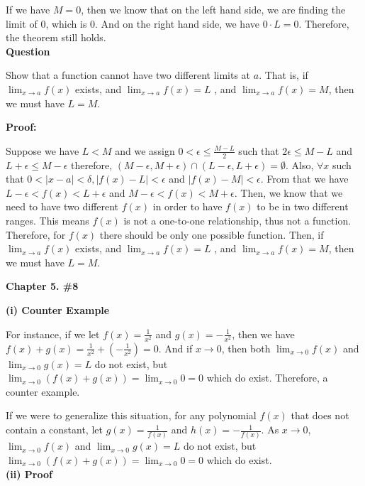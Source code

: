 \documentclass[a4paper,12pt]{report}
\begin{document}
\noindent
If we have $M=0$, then we know that on the left hand side, we are finding the limit of 0, which is 0. And on the right hand side, we have $0\cdot{L}=0$. Therefore, the theorem still holds.\\

\noindent
\textbf{Question}

\noindent
Show that a function cannot
have two different limits at $a$. That is, 
if $\displaystyle{\lim_{x\to a}}f(x)$ exists, and 
$\displaystyle{\lim_{x\to a}}f(x)=L$ , and
$\displaystyle{\lim_{x\to a}}f(x)=M$, then we
must have $L=M$.

\noindent
\textbf{Proof: }

\noindent
Suppose we have $ L < M$ and we assign $0<\epsilon\leq \frac{M-L}{2}$ such that $2\epsilon\leq M-L$ and $L+\epsilon\leq M-\epsilon$ therefore, $(M-\epsilon,M+\epsilon)\cap (L-\epsilon,L+\epsilon)=\emptyset$. Also, $\forall x $ such that $0<|x-a|<\delta, |f(x)-L|< \epsilon$ and $|f(x)-M|< \epsilon$. From that we have $L-\epsilon<f(x)<L+\epsilon$ and $M-\epsilon<f(x)<M+\epsilon$. Then, we know that we need to have two different $f(x)$ in order to have $f(x)$ to be in two different ranges. This means $f(x)$ is not a one-to-one relationship, thus not a function. Therefore, for $f(x)$ there should be only one possible function. Then, if  $\displaystyle{\lim_{x\to a}}f(x)$ exists, and 
$\displaystyle{\lim_{x\to a}}f(x)=L$ , and
$\displaystyle{\lim_{x\to a}}f(x)=M$, then we
must have $L=M$.

\pagebreak
\noindent
\textbf{Chapter 5. \#8}

\noindent
\textbf{(i) Counter Example}

\noindent
For instance, if we let \(f(x)=\frac{1}{x^2}\) and \(g(x)=-\frac{1}{x^2}\), then we have $f(x)+g(x)=\frac{1}{x^2}+(-\frac{1}{x^2})=0$. And if $x\rightarrow 0$, then both $\displaystyle{\lim_{x\to 0}}f(x)$ and $\displaystyle{\lim_{x\to 0}}g(x)=L$ do not exist, but $\displaystyle{\lim_{x\to 0}}(f(x)+g(x))=\displaystyle{\lim_{x\to 0}}0=0$ which do exist. Therefore, a counter example. 

\noindent
If we were to generalize this situation, for any polynomial $f(x)$ that does not contain a constant, let $g(x)=\frac{1}{f(x)}$ and $h(x)=-\frac{1}{f(x)}$. As $x\to 0$,$\displaystyle{\lim_{x\to 0}}f(x)$ and $\displaystyle{\lim_{x\to 0}}g(x)=L$ do not exist, but $\displaystyle{\lim_{x\to 0}}(f(x)+g(x))=\displaystyle{\lim_{x\to 0}}0=0$ which do exist.\\

\noindent
\textbf{(ii) Proof}
\end{document}
